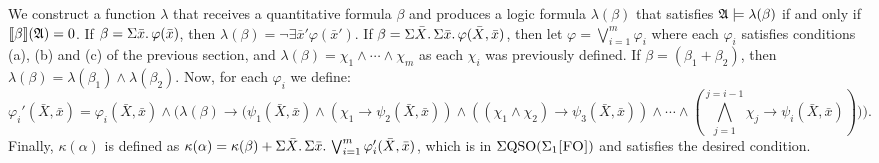 We construct a function $\lambda$ that receives a quantitative formula $\beta$ and produces a logic formula $\lambda(\beta)$ that satisfies $\mathfrak{A}\models\lambda(\beta)$ if and only if ${\llbracket{}{\beta}\rrbracket}(\mathfrak{A}) = 0$. If $\beta = \Sigma{\bar{x}}.\, \varphi(\bar{x})$, then $\lambda(\beta) = \neg\exists\bar{x}'\varphi(\bar{x}')$. If $\beta = \Sigma{\bar{X}}.\,\Sigma{\bar{x}}.\,\varphi(\bar{X},\bar{x})$, then let $\varphi = \bigvee_{i = 1}^{m}\varphi_i$ where each $\varphi_i$ satisfies conditions (a), (b) and (c) of the previous section, and $\lambda(\beta) = \chi_1\wedge \cdots\wedge\chi_m$ as each $\chi_i$ was previously defined. If $\beta = (\beta_1 + \beta_2)$, then $\lambda(\beta) = \lambda(\beta_1) \wedge \lambda(\beta_2)$.
Now, for each $\varphi_i$ we define:
$$
\varphi_i'(\bar{X},\bar{x}) = \varphi_i(\bar{X},\bar{x})\wedge\Big(\lambda(\beta)\to\Big(\psi_1(\bar{X},\bar{x})\wedge(\chi_1\to\psi_2(\bar{X},\bar{x}))\wedge((\chi_1\wedge\chi_2)\to\psi_3(\bar{X},\bar{x}))\wedge\cdots\wedge(
\bigwedge_{j = 1}^{j = i-1}\chi_j\to\psi_i(\bar{X},\bar{x}))\Big)\Big).
$$
Finally, $\kappa(\alpha)$ is defined as $\kappa(\alpha) = \kappa(\beta) + \Sigma{\bar{X}}.\,\Sigma{\bar{x}}.\, \bigvee_{i = 1}^m\varphi_i'(\bar{X},\bar{x})$, which is in $\Sigma{\rm QSO}(\Sigma_{1}\textsc{[FO]})$ and satisfies the desired condition.









